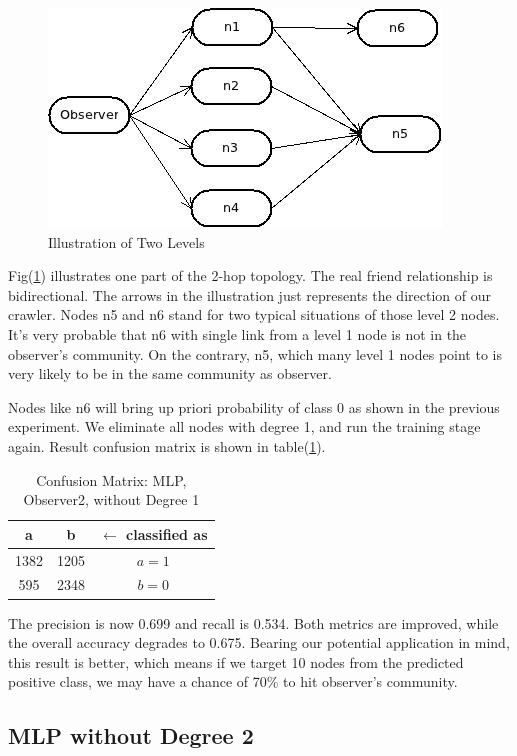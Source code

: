 \documentclass[11pt,a4paper]{article}
\begin{document}
\begin{figure}[htb]
	\centering
	\includegraphics[width=0.5\linewidth]{fig/illustration_2hop_level2.jpg}
	\caption{Illustration of Two Levels}
	\label{fig:illu_l2}
\end{figure}

Fig(\ref{fig:illu_l2}) illustrates one part of the 2-hop 
topology. The real friend relationship is bidirectional. 
The arrows in the illustration just represents the direction 
of our crawler. Nodes n5 and n6 stand for two typical situations 
of those level 2 nodes. It's very probable that n6 with single link 
from a level 1 node is not in the observer's community. 
On the contrary, n5, which many level 1 nodes point to is very likely
to be in the same community as observer. 

Nodes like n6 will bring up priori probability of class 0 as shown in 
the previous experiment. We eliminate all nodes with degree 1, and 
run the training stage again. Result confusion matrix is shown 
in table(\ref{tbl:cm_o2_d1}). 

\begin{table}[htb]
	\centering
	\caption{Confusion Matrix: MLP, Observer2, without Degree 1}
	\label{tbl:cm_o2_d1}
	\begin{tabular}{cc|c}
	\hline
a & b & \textbf{$\leftarrow$ classified as}\\	
	\hline
 1382 &1205 &    $a = 1$\\
  595 &2348 &    $b = 0$\\
	\hline
	\end{tabular}
\end{table}

The precision is now 0.699 and recall is  0.534. 
Both metrics are improved, while the overall accuracy 
degrades to 0.675. Bearing our potential application in mind, 
this result is better, which means if we target 10 nodes 
from the predicted positive class, we may have a chance
of 70\% to hit observer's community. 

\subsection{MLP without Degree 2}
\end{document}
